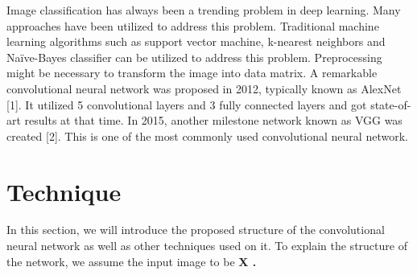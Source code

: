 \documentclass[twoside,twocolumn,10.8pt]{article}
\begin{document}
Image classification has always been a trending problem in deep learning. Many approaches have been utilized to address this problem. Traditional machine learning algorithms such as support vector machine, k-nearest neighbors and Naïve-Bayes classifier can be utilized to address this problem. Preprocessing might be necessary to transform the image into data matrix. A remarkable convolutional neural network was proposed in 2012, typically known as AlexNet [1]. It utilized 5 convolutional layers and 3 fully connected layers and got state-of-art results at that time. In 2015, another milestone network known as VGG was created [2]. This is one of the most commonly used convolutional neural network.



\section{Technique}

In this section, we will introduce the proposed structure of the convolutional neural network as well as other techniques used on it. To explain the structure of the network, we assume the input image to be \bf X \rm. 
\end{document}
